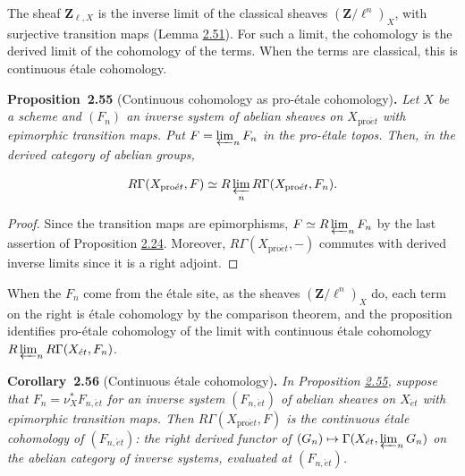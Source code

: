 \documentclass[11pt]{article}
\newenvironment{bpstatement}[2]{\par\addvspace{0.6\baselineskip}\noindent\textbf{#1}#2\textbf{.}\enspace\ignorespaces}
  {\par\addvspace{0.4\baselineskip}}
\newenvironment{bpstatementit}[2]{\begin{bpstatement}{#1}{#2}\itshape\ignorespaces}{\end{bpstatement}}
\begin{document}
The sheaf \(\mathbf Z_{\ell,X}\) is the inverse limit of the classical sheaves \((\mathbf Z/\ell^n)_X\), with surjective transition maps (Lemma \hyperref[bp158]{2.51}). For such a limit, the cohomology is the derived limit of the cohomology of the terms. When the terms are classical, this is continuous étale cohomology.

\label{bp172}%
\begin{bpstatementit}{Proposition~2.55}{ (Continuous cohomology as pro-étale cohomology)}
Let \(X\) be a scheme and \((F_n)\) an inverse system of abelian sheaves on \(X_{\mathrm{pro}\acute{e}t}\) with epimorphic transition maps. Put \(F=\varprojlim_nF_n\) in the pro-étale topos. Then, in the derived category of abelian groups,

\[
R\Gamma(X_{\mathrm{pro}\acute{e}t},F)
\simeq R\varprojlim_n R\Gamma(X_{\mathrm{pro}\acute{e}t},F_n).
\]
\end{bpstatementit}

\begin{proof}[{Proof}]\label{bp173}%
Since the transition maps are epimorphisms, \(F\simeq R\varprojlim_nF_n\) by the last assertion of Proposition \hyperref[bp71]{2.24}. Moreover, \(R\Gamma(X_{\mathrm{pro}\acute{e}t},-)\) commutes with derived inverse limits since it is a right adjoint.
\end{proof}

\label{bp174}%
When the \(F_n\) come from the étale site, as the sheaves \((\mathbf Z/\ell^n)_X\) do, each term on the right is étale cohomology by the comparison theorem, and the proposition identifies pro-étale cohomology of the limit with continuous étale cohomology \(R\varprojlim_nR\Gamma(X_{\acute{e}t},F_n)\).

\label{bp175}%
\begin{bpstatementit}{Corollary~2.56}{ (Continuous étale cohomology)}
In Proposition \hyperref[bp172]{2.55}, suppose that \(F_n=\nu_X^*F_{n,\acute{e}t}\) for an inverse system \((F_{n,\acute{e}t})\) of abelian sheaves on \(X_{\acute{e}t}\) with epimorphic transition maps. Then \(R\Gamma(X_{\mathrm{pro}\acute{e}t},F)\) is the continuous étale cohomology of \((F_{n,\acute{e}t})\): the right derived functor of \((G_n)\mapsto\Gamma(X_{\acute{e}t},\varprojlim_nG_n)\) on the abelian category of inverse systems, evaluated at \((F_{n,\acute{e}t})\).
\end{bpstatementit}
\end{document}
